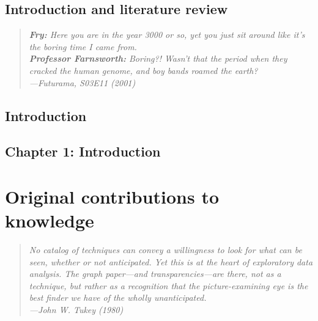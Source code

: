 \documentclass[12pt, TexShade, letterpaper]{report}
\makeatletter
\newcommand{\unchapter}[1]{%
  \begingroup
  \let\@makechapterhead\@gobble %
  \chapter{#1}
  \endgroup
}
\makeatother
\begin{document}
\begin{refsection}
\part{Introduction and literature review}
\label{part:intro}

\pagebreak
\hspace{0pt}
\vfill

\begin{center}
\begin{quote} 
\begin{singlespace}
\textit{
\textbf{Fry:} Here you are in the year 3000 or so, yet you just sit around like it's the boring time I came from.\\
\textbf{Professor Farnsworth:} Boring?! Wasn't that the period when they cracked the human genome, and boy bands roamed the earth? \\
---Futurama, S03E11 (2001)}
\end{singlespace}
\end{quote}
\end{center}

\vfill
\hspace{0pt}
\pagebreak

\unchapter{Introduction}
\chapter*{Chapter 1: Introduction}

\printbibliography[heading=subbibintoc]
\end{refsection}

%
%

\part{Original contributions to knowledge}
\label{part:manuscripts}

\pagebreak
\hspace{0pt}
\vfill

\begin{center}
\begin{quote} 
\begin{singlespace}
\textit{No catalog of techniques can convey a willingness to look for what can be seen, whether or not anticipated. Yet this is at the heart of exploratory data analysis. The graph paper---and transparencies---are there, not as a technique, but rather as a recognition that the picture-examining eye is the best finder we have of the wholly unanticipated. \\
---John W. Tukey (1980)}
\end{singlespace}
\end{quote}
\end{center}
\end{document}
